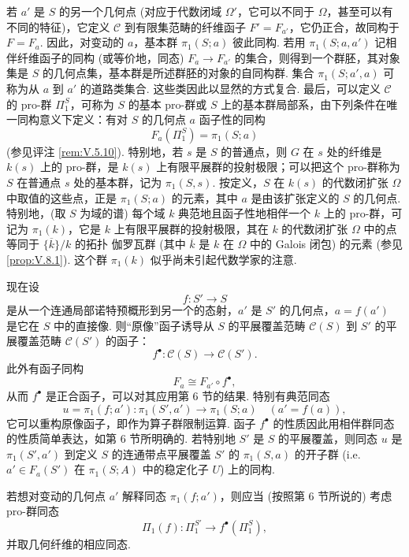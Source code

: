 若 $a'$ 是 $S$ 的另一个几何点 (对应于代数闭域 $\Omega'$，它可以不同于 $\Omega$，甚至可以有不同的特征)，它定义 $\mathcal{C}$ 到有限集范畴的纤维函子 $F' = F_{a'}$，它仍正合，故同构于 $F = F_a$. 因此，对变动的 $a$，基本群 $\pi_1(S; a)$ 彼此同构. 若用 $\pi_1(S; a, a')$ 记相伴纤维函子的同构 (或等价地，同态) $F_a \to F_{a'}$ 的集合，则得到一个群胚，其对象集是 $S$ 的几何点集，基本群是所述群胚的对象的自同构群. 集合 $\pi_1(S; a', a)$ 可称为从 $a$ 到 $a'$ 的道路类集合. 这些类因此以显然的方式复合. 最后，可以定义 $\mathcal{C}$ 的 pro-群 $\Pi_1^{S}$，可称为 $S$ 的基本 pro-群或 $S$ 上的基本群局部系，由下列条件在唯一同构意义下定义：有对 $S$ 的几何点 $a$ 函子性的同构
\[
F_a(\Pi_1^{S}) = \pi_1(S; a)
\]
(参见评注 \ref{rem:V.5.10}). 特别地，若 $s$ 是 $S$ 的普通点，则 $G$ 在 $s$ 处的纤维是 $k(s)$ 上的 pro-群，是 $k(s)$ 上有限平展群的投射极限；可以把这个 pro-群称为 $S$ 在普通点 $s$ 处的基本群，记为 $\pi_1(S, s)$. 按定义，$S$ 在 $k(s)$ 的代数闭扩张 $\Omega$ 中取值的这些点，正是 $\pi_1(S; a)$ 的元素，其中 $a$ 是由该扩张定义的 $S$ 的几何点. 特别地，(取 $S$ 为域的谱) 每个域 $k$ 典范地且函子性地相伴一个 $k$ 上的 pro-群，可记为 $\pi_1(k)$，它是 $k$ 上有限平展群的投射极限，其在 $k$ 的代数闭扩张 $\Omega$ 中的点等同于 $\overline{\{k\}}/k$ 的拓扑 伽罗瓦群 (其中 $\overline{k}$ 是 $k$ 在 $\Omega$ 中的 Galois 闭包) 的元素 (参见 \ref{prop:V.8.1}). 这个群 $\pi_1(k)$ 似乎尚未引起代数学家的注意.

现在设
\[
f \colon S' \longrightarrow S
\]
是从一个连通局部诺特预概形到另一个的态射，$a'$ 是 $S'$ 的几何点，$a = f(a')$ 是它在 $S$ 中的直接像. 则``原像''函子诱导从 $S$ 的平展覆盖范畴 $\mathcal{C}(S)$ 到 $S'$ 的平展覆盖范畴 $\mathcal{C}(S')$ 的函子：
\[
f^{\bullet} \colon \mathcal{C}(S) \longrightarrow \mathcal{C}(S').
\]
此外有函子同构
\[
F_a \cong F_{a'} \circ f^{\bullet},
\]
从而 $f^{\bullet}$ 是正合函子，可以对其应用第 6 节的结果. 特别有典范同态
\[
u = \pi_1(f; a')\colon \pi_1(S', a') \longrightarrow \pi_1(S; a) \quad (a' = f(a)),
\]
它可以重构原像函子，即作为算子群限制运算. 函子 $f^{\bullet}$ 的性质因此用相伴群同态的性质简单表达，如第 6 节所明确的. 若特别地 $S'$ 是 $S$ 的平展覆盖，则同态 $u$ 是 $\pi_1(S', a')$ 到定义 $S$ 的连通带点平展覆盖 $S'$ 的 $\pi_1(S, a)$ 的开子群 (i.e. $a' \in F_a(S')$ 在 $\pi_1(S; A)$ 中的稳定化子 $U$) 上的同构.

若想对变动的几何点 $a'$ 解释同态 $\pi_1(f; a')$，则应当 (按照第 6 节所说的) 考虑 pro-群同态
\[
\Pi_1(f) \colon \Pi_1^{S'} \longrightarrow f^{\bullet}(\Pi_1^{S}),
\]
并取几何纤维的相应同态.

